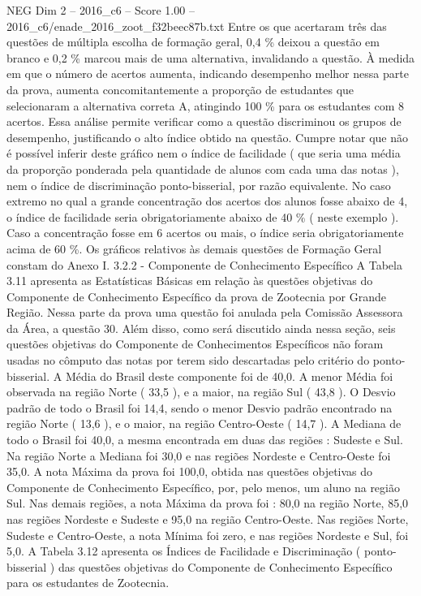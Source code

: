 \begin{textsample}{NEG Dim 2 – 2016\_c6 – Score 1.00 – 2016\_c6/enade\_2016\_zoot\_f32beec87b.txt}
Entre os que acertaram três das questões de múltipla escolha de formação geral, 0,4 \% deixou a questão em branco e 0,2 \% marcou mais de uma alternativa, invalidando a questão.
À medida em que o número de acertos aumenta, indicando desempenho melhor nessa parte da prova, aumenta concomitantemente a proporção de estudantes que selecionaram a alternativa correta A, atingindo 100 \% para os estudantes com 8 acertos.
Essa análise permite verificar como a questão discriminou os grupos de desempenho, justificando o alto índice obtido na questão.
Cumpre notar que não é possível inferir deste gráfico nem o índice de facilidade ( que seria uma média da proporção ponderada pela quantidade de alunos com cada uma das notas ), nem o índice de discriminação ponto-bisserial, por razão equivalente.
No caso extremo no qual a grande concentração dos acertos dos alunos fosse abaixo de 4, o índice de facilidade seria obrigatoriamente abaixo de 40 \% ( neste exemplo ).
Caso a concentração fosse em 6 acertos ou mais, o índice seria obrigatoriamente acima de 60 \%.
Os gráficos relativos às demais questões de Formação Geral constam do Anexo I. 3.2.2 - Componente de Conhecimento Específico A Tabela 3.11 apresenta as Estatísticas Básicas em relação às questões objetivas do Componente de Conhecimento Específico da prova de Zootecnia por Grande Região.
Nessa parte da prova uma questão foi anulada pela Comissão Assessora da Área, a questão 30.
Além disso, como será discutido ainda nessa seção, seis questões objetivas do Componente de Conhecimentos Específicos não foram usadas no cômputo das notas por terem sido descartadas pelo critério do ponto-bisserial.
A Média do Brasil deste componente foi de 40,0.
A menor Média foi observada na região Norte ( 33,5 ), e a maior, na região Sul ( 43,8 ).
O Desvio padrão de todo o Brasil foi 14,4, sendo o menor Desvio padrão encontrado na região Norte ( 13,6 ), e o maior, na região Centro-Oeste ( 14,7 ).
A Mediana de todo o Brasil foi 40,0, a mesma encontrada em duas das regiões : Sudeste e Sul.
Na região Norte a Mediana foi 30,0 e nas regiões Nordeste e Centro-Oeste foi 35,0.
A nota Máxima da prova foi 100,0, obtida nas questões objetivas do Componente de Conhecimento Específico, por, pelo menos, um aluno na região Sul.
Nas demais regiões, a nota Máxima da prova foi : 80,0 na região Norte, 85,0 nas regiões Nordeste e Sudeste e 95,0 na região Centro-Oeste.
Nas regiões Norte, Sudeste e Centro-Oeste, a nota Mínima foi zero, e nas regiões Nordeste e Sul, foi 5,0.
A Tabela 3.12 apresenta os Índices de Facilidade e Discriminação ( ponto-bisserial ) das questões objetivas do Componente de Conhecimento Específico para os estudantes de Zootecnia.

\end{textsample}
